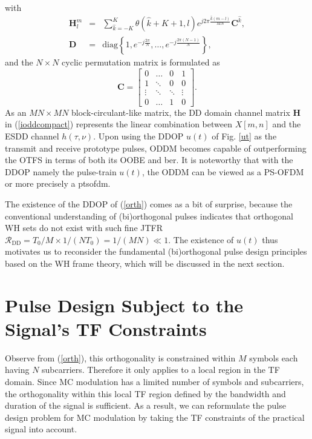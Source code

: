 \documentclass[journal]{IEEEtran}
\begin{document}
with
\begin{eqnarray}
  \mathbf H_l^m & = & \sum_{\hat k=-K}^{K} \theta(\hat k+K+1,l) e^{j2\pi \frac{\hat k(m-l)}{MN} } \mathbf C^{\hat k}, \\
  \mathbf D & = & \textrm{diag}\left\{1, e^{-j\frac{2\pi}{N}},\ldots, e^{-j\frac{2\pi(N-1)}{N}}\right\},
\end{eqnarray}
and the $N \times N$ cyclic permutation matrix is formulated as
\begin{equation}
  \mathbf C=
  \begin{bmatrix}
    0      & \ldots & 0      & 1      \\
    1      & \ddots & 0      & 0      \\
    \vdots & \ddots & \ddots & \vdots \\
    0      & \ldots & 1      & 0
  \end{bmatrix}.
\end{equation}
As an  $MN \times MN$ block-circulant-like matrix, the DD domain channel matrix $\mathbf H$ in (\ref{ioddcompact}) represents the linear combination between {$X[m,n]$} and the ESDD channel $h(\tau, \nu)$.
Upon using the DDOP $u(t)$ of Fig. \ref{ut} as the transmit and receive prototype pulses, ODDM becomes capable of outperforming the OTFS in terms of both its OOBE and \ac{ber}\cite{oddmicc22,oddm}.
{It is noteworthy that with the DDOP namely the pulse-train $u(t)$, the ODDM can be viewed as a PS-OFDM or more precisely a \ac{ptsofdm}.}

The existence of the DDOP of (\ref{orth}) comes as a bit of surprise, because the conventional understanding of (bi)orthogonal pulses indicates that orthogonal WH sets do not exist with such fine JTFR $\mathcal R_{\textrm{DD}}=  T_0/M\times 1/(NT_0)=1/(MN)\ll 1$. The existence of $u(t)$ thus motivates us to reconsider the fundamental (bi)orthogonal pulse design principles based on the WH frame theory, which will be discussed in the next section.

\section{Pulse Design Subject to the Signal's TF Constraints}
Observe from (\ref{orth}), this orthogonality is constrained within
$M$ symbols each having $N$ subcarriers. Therefore it only applies
to a local region in the TF domain. Since MC modulation has a limited
number of symbols and subcarriers, the orthogonality within
this local TF region defined by the bandwidth and duration of the signal is sufficient. As a result, we can reformulate the pulse design problem for MC modulation by taking the {TF constraints of the practical signal} into account.
\end{document}
